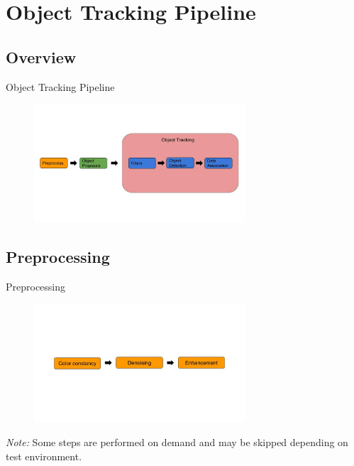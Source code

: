 \documentclass{beamer}
\begin{document}

\section{Object Tracking Pipeline}

\subsection{Overview}
\begin{frame}{Object Tracking Pipeline}
    \begin{figure}[ht]
        \includegraphics[width=0.7\textwidth]{figs/tracker_pipeline.jpg}
    \end{figure}
\end{frame}

\subsection{Preprocessing}
\begin{frame}{Preprocessing}
    \begin{figure}[ht]
        \centering
        \includegraphics[width=0.7\textwidth, height=0.5\textheight]{figs/preprocess_pipeline.jpg}
    \end{figure}
    \textit{Note:} Some steps are performed on demand and may be skipped depending on test environment.
\end{frame}
\end{document}
